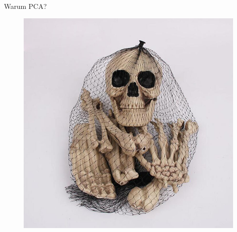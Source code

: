 \documentclass{beamer}
\begin{document}
\begin{frame}{Warum PCA?}
 \begin{figure}
  \centering
  \includegraphics[height=0.7\textheight]{graphics/skeleton_set.jpg}
  \caption{\cite{skeleton_set}}
 \end{figure}
\end{frame}
\end{document}
